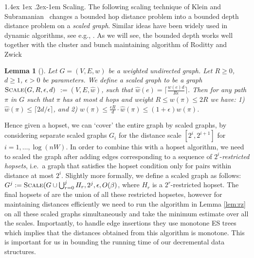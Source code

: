 \documentclass[11pt]{article}
\makeatletter
\newtheorem{lemma}[theorem]{Lemma}
\theoremstyle{definition}
\theoremstyle{remark}
\renewcommand{\paragraph}{%
  \@startsection{paragraph}{4}%
  {\z@}{1.4ex \@plus 1ex \@minus .2ex}{-1em}%
  {\normalfont\normalsize\bfseries}%
}
\makeatother
\begin{document}
\paragraph{Scaling.}
The following scaling technique of Klein and Subramanian~\cite{KS97} changes a bounded hop distance problem into a bounded depth distance problem on a \textit{scaled graph}. Similar ideas have been widely used in dynamic algorithms, see e.g., \cite{Bernstein09,BR11,henzinger2014decremental,LN2020}. As we will see, the bounded depth works well together with the cluster and bunch maintaining algorithm of Roditty and Zwick~\cite{RZ12}
\begin{lemma}[\cite{KS97}]\label{lem:rounding}
Let $G=(V,E,w)$ be a weighted undirected graph. Let $R \geq 0$, $d \geq 1$, $\epsilon > 0$ be parameters.
We define a \emph{scaled graph} to be a graph $\textsc{Scale}(G, R, \epsilon, d)$ $:=  (V, E, \hat{w})$, such that $\hat{w}(e) = \lceil \tfrac{w(e)d}{R \epsilon} \rceil$.
Then for any path $\pi$ in $G$ such that $\pi$ has at most $d$ hops and weight $R \leq w(\pi) \leq 2R$ we have: 1) $\hat{w}(\pi) \leq \lceil 2d/\epsilon \rceil$, and 2) $w(\pi) \leq \tfrac{\epsilon R}{d} \cdot \hat{w}(\pi) \leq (1+\epsilon) w(\pi)$.
\end{lemma}

Hence given a hopset, we can `cover' the entire graph by scaled graphs, by considering separate scaled graphs $G_i$ for the distance scale $[2^i, 2^{i+1}]$ for $i=1,\dots, \log(nW)$. In order to combine this with a hopset algorithm, we need to scaled the graph after adding edges corresponding to a sequence of $2^i$-\textit{restricted hopsets}, i.e.~a graph that satisfies the hopset condition only for pairs within distance at most $2^i$. Slightly more formally, we define a scaled graph
as follows: $G^j := \textsc{Scale}(G \cup \bigcup_{r=0}^{j} H_{r}, 2^j, \epsilon, O(\beta)$, where $H_{r}$ is a $2^r$-restricted hopset. The final hopsets of \cite{LN2020} are the union of all these restricted hopsetes, however for maintaining distances efficiently we need to run the algorithm in Lemma \ref{lem:rz} on all these scaled graphs simultaneously and take the minimum estimate over all the scales. Importantly, to handle edge insertions they use monotone ES trees which implies that the distances obtained from this algorithm is monotone. This is important for us in bounding the running time of our decremental data structures.
\end{document}
